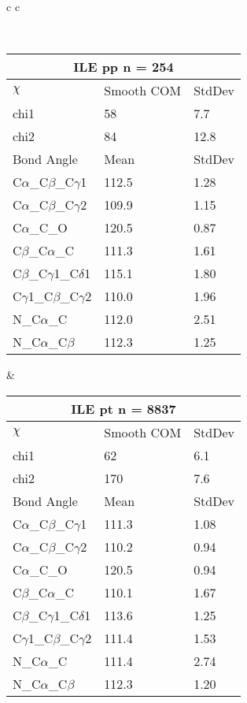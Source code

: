 \begin{longtable}{ c c }

\caption{ILE Central Values}\\
  \begin{tabular}{ l l l }
  \toprule
  \multicolumn{3}{c}{ILE \textbf{pp} n = 254} \\ \toprule
  $\chi$       & Smooth COM & StdDev \\ \midrule
  chi1 & 58 & 7.7 \\ 
  chi2 & 84 & 12.8 \\ \midrule
  Bond Angle   & Mean     & StdDev \\ \midrule
  C$\alpha$\_C$\beta$\_C$\gamma$1 & 112.5 & 1.28\\
  C$\alpha$\_C$\beta$\_C$\gamma$2 & 109.9 & 1.15\\
  C$\alpha$\_C\_O & 120.5 & 0.87\\
  C$\beta$\_C$\alpha$\_C & 111.3 & 1.61\\
  C$\beta$\_C$\gamma$1\_C$\delta$1 & 115.1 & 1.80\\
  C$\gamma$1\_C$\beta$\_C$\gamma$2 & 110.0 & 1.96\\
  N\_C$\alpha$\_C & 112.0 & 2.51\\
  N\_C$\alpha$\_C$\beta$ & 112.3 & 1.25\\
  \bottomrule
  \end{tabular}
  &
  \begin{tabular}{ l l l }
  \toprule
  \multicolumn{3}{c}{ILE \textbf{pt} n = 8837} \\ \toprule
  $\chi$       & Smooth COM & StdDev \\ \midrule
  chi1 & 62 & 6.1 \\ 
  chi2 & 170 & 7.6 \\ \midrule
  Bond Angle   & Mean     & StdDev \\ \midrule
  C$\alpha$\_C$\beta$\_C$\gamma$1 & 111.3 & 1.08\\
  C$\alpha$\_C$\beta$\_C$\gamma$2 & 110.2 & 0.94\\
  C$\alpha$\_C\_O & 120.5 & 0.94\\
  C$\beta$\_C$\alpha$\_C & 110.1 & 1.67\\
  C$\beta$\_C$\gamma$1\_C$\delta$1 & 113.6 & 1.25\\
  C$\gamma$1\_C$\beta$\_C$\gamma$2 & 111.4 & 1.53\\
  N\_C$\alpha$\_C & 111.4 & 2.74\\
  N\_C$\alpha$\_C$\beta$ & 112.3 & 1.20\\
  \bottomrule
  \end{tabular}

\end{longtable}
